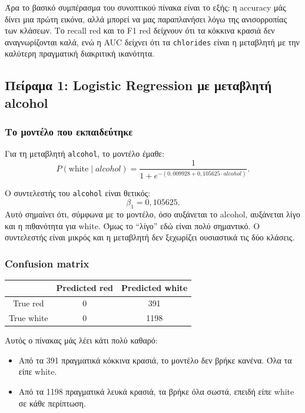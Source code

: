 \documentclass[11pt,a4paper]{article}
\newcommand{\code}[1]{\texttt{#1}}
\begin{document}
Άρα το βασικό συμπέρασμα του συνοπτικού πίνακα είναι το εξής: η accuracy μάς
δίνει μια πρώτη εικόνα, αλλά μπορεί να μας παραπλανήσει λόγω της ανισορροπίας
των κλάσεων. Το recall red και το F1 red δείχνουν ότι τα κόκκινα κρασιά δεν
αναγνωρίζονται καλά, ενώ η AUC δείχνει ότι τα \code{chlorides} είναι η
μεταβλητή με την καλύτερη πραγματική διακριτική ικανότητα.

\subsection{Πείραμα 1: Logistic Regression με μεταβλητή alcohol}

\subsubsection{Το μοντέλο που εκπαιδεύτηκε}

Για τη μεταβλητή \code{alcohol}, το μοντέλο έμαθε:
\[
P(\text{white} \mid alcohol) =
\frac{1}{1 + e^{-(0{,}009928 + 0{,}105625 \cdot alcohol)}}.
\]

Ο συντελεστής του \code{alcohol} είναι θετικός:
\[
\beta_1 = 0{,}105625.
\]
Αυτό σημαίνει ότι, σύμφωνα με το μοντέλο, όσο αυξάνεται το alcohol,
αυξάνεται λίγο και η πιθανότητα για white. Όμως το ``λίγο'' εδώ είναι
πολύ σημαντικό. Ο συντελεστής είναι μικρός και η μεταβλητή δεν ξεχωρίζει
ουσιαστικά τις δύο κλάσεις.

\subsubsection{Confusion matrix}

\begin{center}
\begin{tabular}{c|cc}
\toprule
 & Predicted red & Predicted white \\
\midrule
True red & 0 & 391 \\
True white & 0 & 1198 \\
\bottomrule
\end{tabular}
\end{center}

Αυτός ο πίνακας μάς λέει κάτι πολύ καθαρό:
\begin{itemize}
    \item Από τα 391 πραγματικά κόκκινα κρασιά, το μοντέλο δεν βρήκε κανένα.
    Όλα τα είπε white.
    \item Από τα 1198 πραγματικά λευκά κρασιά, τα βρήκε όλα σωστά, επειδή
    είπε white σε κάθε περίπτωση.
\end{itemize}
\end{document}
